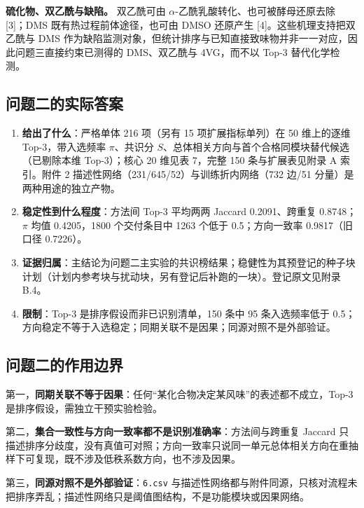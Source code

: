 \documentclass[11pt,a4paper]{article}
\providecommand{\tightlist}{%
  \setlength{\itemsep}{0pt}\setlength{\parskip}{0pt}}
\begin{document}
\textbf{硫化物、双乙酰与缺陷。} 双乙酰可由
\(\alpha\)-乙酰乳酸转化、也可被酵母还原去除 {[}3{]}；DMS
既有热过程前体途径，也可由 DMSO 还原产生 {[}4{]}。这些机理支持把双乙酰与
DMS
作为缺陷监测对象，但统计排序与已知直接致味物并非一一对应，因此问题三直接约束已测得的
DMS、双乙酰与 4VG，而不以 Top-3 替代化学检测。

\subsection{问题二的实际答案}\label{ux95eeux9898ux4e8cux7684ux5b9eux9645ux7b54ux6848}

\begin{enumerate}
\def\labelenumi{\arabic{enumi}.}
\tightlist
\item
  \textbf{给出了什么}：严格单体 216 项（另有 15 项扩展指标单列）在 50
  维上的逐维 Top-3，带入选频率 \(\pi\)、共识分
  \(S\)、总体相关方向与首个合格同模块替代候选（已剔除本维 Top-3）；核心
  20 维见表 7，完整 150 条与扩展表见附录 A 索引。附件 2
  描述性网络（231/645/52）与训练折内网络（732 边/51
  分量）是两种用途的独立产物。
\item
  \textbf{稳定性到什么程度}：方法间 Top-3 平均两两 Jaccard
  0.2091、跨重复 0.8748；\(\pi\) 均值 0.4205，1800 个交付条目中 1263
  个低于 0.5；方向一致率 0.9817（旧口径 0.7226）。
\item
  \textbf{证据归属}：主结论为问题二主实验的共识榜结果；稳健性为其预登记的种子块计划（计划内参考块与扰动块，另有登记后补跑的一块）。登记原文见附录
  B.4。
\item
  \textbf{限制}：Top-3 是排序假设而非已识别清单，150 条中 95
  条入选频率低于
  0.5；方向稳定不等于入选稳定；同期关联不是因果；同源对照不是外部验证。
\end{enumerate}

\subsection{问题二的作用边界}\label{ux95eeux9898ux4e8cux7684ux4f5cux7528ux8fb9ux754c}

第一，\textbf{同期关联不等于因果}：任何``某化合物决定某风味''的表述都不成立，Top-3
是排序假设，需独立干预实验检验。

第二，\textbf{集合一致性与方向一致率都不是识别准确率}：方法间与跨重复
Jaccard
只描述排序分歧度，没有真值可对照；方向一致率只说同一单元总体相关方向在重抽样下可复现，既不涉及低秩系数方向，也不涉及因果。

第三，\textbf{同源对照不是外部验证}：\texttt{6.csv}
与描述性网络都与附件同源，只核对流程未把排序弄乱；描述性网络只是阈值图结构，不是功能模块或因果网络。
\end{document}
